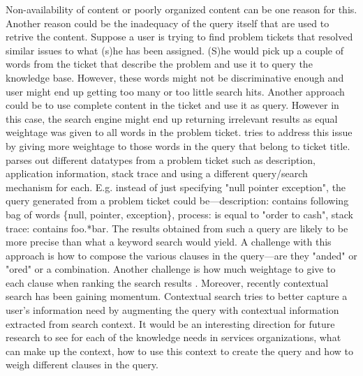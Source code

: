 Non-availability of content or poorly organized content can be one reason for this. Another reason could be the inadequacy of the query itself that are used to retrive the content. Suppose a user is trying to find problem tickets that resolved similar issues to what (s)he has been assigned. (S)he would pick up a couple of words from the ticket that describe the problem and use it to query the knowledge base. However, these words might not be discriminative enough and user might end up getting too many or too little search hits. Another approach could be to use complete content in the ticket and use it as query. However in this case, the search engine might end up returning irrelevant results as equal weightage was given to all words in the problem ticket. \cite{Sinha:2012} tries to address this issue by giving more weightage to those words in the query that belong to ticket title. \cite{Ashok:2009} parses out different datatypes from a problem ticket such as description, application information, stack trace and using a different query/search mechanism for each. E.g. instead of just specifying "null pointer exception", the query generated from a problem ticket could be---description: contains following bag of words \{null, pointer, exception\}, process: is equal to "order to cash", stack trace: contains foo.*bar. The results obtained from such a query are likely to be more precise than what a keyword search would yield. A challenge with this approach is how to compose the various clauses in the query---are they "anded" or "ored" or a combination. Another challenge is how much weightage to give to each clause when ranking the search results \cite{Debdoot:2011:bpm}. Moreover, recently contextual search \cite{} has been gaining momentum. Contextual search tries to better capture a user's information need by augmenting the query with contextual information extracted from search context. It would be an interesting direction for future research to see for each of the knowledge needs in services organizations, what can make up the context, how to use this context to create the query and how to weigh different clauses in the query. 

